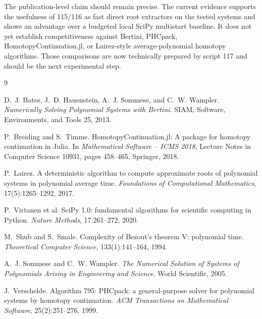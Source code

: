 \documentclass[11pt,a4paper]{article}
\begin{document}
The publication-level claim should remain precise. The current evidence supports the usefulness of 115/116 as fast direct root extractors on the tested systems and shows an advantage over a budgeted local SciPy multistart baseline. It does not yet establish competitiveness against Bertini, PHCpack, HomotopyContinuation.jl, or Lairez-style average-polynomial homotopy algorithms. Those comparisons are now technically prepared by script 117 and should be the next experimental step.

\begin{thebibliography}{9}

D.~J. Bates, J.~D. Hauenstein, A.~J. Sommese, and C.~W. Wampler.
\newblock \emph{Numerically Solving Polynomial Systems with Bertini}.
\newblock SIAM, Software, Environments, and Tools 25, 2013.

P.~Breiding and S.~Timme.
\newblock HomotopyContinuation.jl: A package for homotopy continuation in Julia.
\newblock In \emph{Mathematical Software -- ICMS 2018}, Lecture Notes in Computer Science 10931, pages 458--465, Springer, 2018.

P.~Lairez.
\newblock A deterministic algorithm to compute approximate roots of polynomial systems in polynomial average time.
\newblock \emph{Foundations of Computational Mathematics}, 17(5):1265--1292, 2017.

P.~Virtanen et al.
\newblock SciPy 1.0: fundamental algorithms for scientific computing in Python.
\newblock \emph{Nature Methods}, 17:261--272, 2020.

M.~Shub and S.~Smale.
\newblock Complexity of Bezout's theorem V: polynomial time.
\newblock \emph{Theoretical Computer Science}, 133(1):141--164, 1994.

A.~J. Sommese and C.~W. Wampler.
\newblock \emph{The Numerical Solution of Systems of Polynomials Arising in Engineering and Science}.
\newblock World Scientific, 2005.

J.~Verschelde.
\newblock Algorithm 795: PHCpack: a general-purpose solver for polynomial systems by homotopy continuation.
\newblock \emph{ACM Transactions on Mathematical Software}, 25(2):251--276, 1999.

\end{thebibliography}
\end{document}
